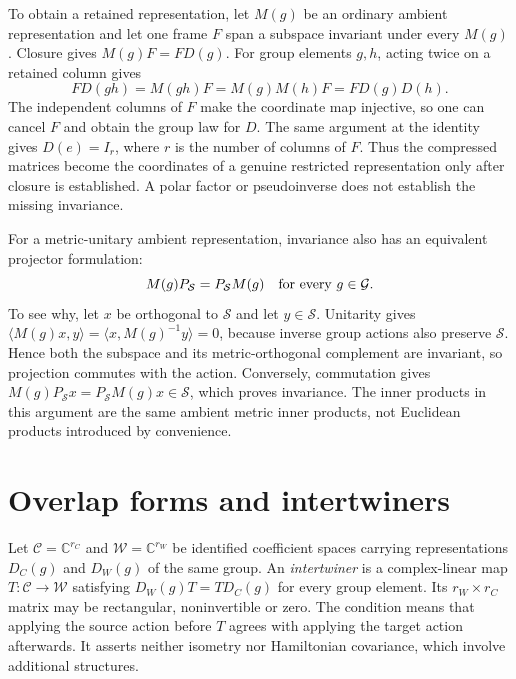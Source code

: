 To obtain a retained representation, let $M(g)$ be an ordinary ambient
representation and let one frame $F$ span a subspace invariant under every
$M(g)$. Closure gives $M(g)F=FD(g)$. For group elements $g,h$, acting twice
on a retained column gives
\begin{equation}
  FD(gh)=M(gh)F=M(g)M(h)F=FD(g)D(h).
  \label{eq:symmetry-restricted-group-law}
\end{equation}
The independent columns of $F$ make the coordinate map injective, so one can
cancel $F$ and obtain the group law for $D$. The same argument at the identity
gives $D(e)=I_r$, where $r$ is the number of columns of $F$. Thus the
compressed matrices become the coordinates of a genuine restricted
representation only after closure is established. A polar factor or
pseudoinverse does not establish the missing invariance.

For a metric-unitary ambient representation, invariance also has an equivalent
projector formulation:
\begin{equation}
  M(g)P_{\mathcal S}=P_{\mathcal S}M(g)
  \quad\hbox{for every }g\in\mathcal G.
  \label{eq:symmetry-invariant-projector-commutation}
\end{equation}
To see why, let $x$ be orthogonal to $\mathcal S$ and let $y\in\mathcal S$.
Unitarity gives $\langle M(g)x,y\rangle
=\langle x,M(g)^{-1}y\rangle=0$, because inverse group actions also preserve
$\mathcal S$. Hence both the subspace and its metric-orthogonal complement
are invariant, so projection commutes with the action. Conversely,
commutation gives $M(g)P_{\mathcal S}x=P_{\mathcal S}M(g)x\in\mathcal S$,
which proves invariance. The inner products in this argument are the same
ambient metric inner products, not Euclidean products introduced by convenience.

\section{Overlap forms and intertwiners}

\begin{definition}
\label{def:symmetry-intertwiner}
Let $\mathcal C=\mathbb C^{r_C}$ and $\mathcal W=\mathbb C^{r_W}$ be identified
coefficient spaces carrying representations $D_C(g)$ and $D_W(g)$ of the
same group. An \emph{intertwiner} is a complex-linear map
$T:\mathcal C\to\mathcal W$ satisfying $D_W(g)T=TD_C(g)$ for every group
element. Its $r_W\times r_C$ matrix may be rectangular, noninvertible or zero.
The condition means that applying the source action before $T$ agrees with
applying the target action afterwards. It asserts neither isometry nor
Hamiltonian covariance, which involve additional structures.
\end{definition}


